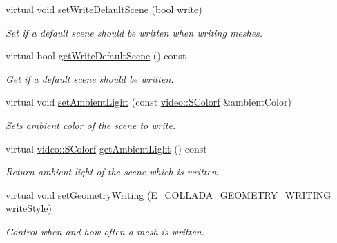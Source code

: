 \begin{DoxyCompactItemize}
virtual void \hyperlink{classirr_1_1scene_1_1IColladaMeshWriter_acf1952c459b4b2bde5b479b6d9717c35}{set\+Write\+Default\+Scene} (bool write)
\begin{DoxyCompactList}\small\item\em Set if a default scene should be written when writing meshes. \end{DoxyCompactList}\item 
\mbox{\label{classirr_1_1scene_1_1IColladaMeshWriter_a311c259b48fade63a30c9b5f422571d4}} 
virtual bool \hyperlink{classirr_1_1scene_1_1IColladaMeshWriter_a311c259b48fade63a30c9b5f422571d4}{get\+Write\+Default\+Scene} () const
\begin{DoxyCompactList}\small\item\em Get if a default scene should be written. \end{DoxyCompactList}\item 
\mbox{\label{classirr_1_1scene_1_1IColladaMeshWriter_a410fb9e46db6250ff8bbf4ddb18ef1f2}} 
virtual void \hyperlink{classirr_1_1scene_1_1IColladaMeshWriter_a410fb9e46db6250ff8bbf4ddb18ef1f2}{set\+Ambient\+Light} (const \hyperlink{classirr_1_1video_1_1SColorf}{video\+::\+S\+Colorf} \&ambient\+Color)
\begin{DoxyCompactList}\small\item\em Sets ambient color of the scene to write. \end{DoxyCompactList}\item 
\mbox{\label{classirr_1_1scene_1_1IColladaMeshWriter_af263653d1159795a9aeead92c4e94b44}} 
virtual \hyperlink{classirr_1_1video_1_1SColorf}{video\+::\+S\+Colorf} \hyperlink{classirr_1_1scene_1_1IColladaMeshWriter_af263653d1159795a9aeead92c4e94b44}{get\+Ambient\+Light} () const
\begin{DoxyCompactList}\small\item\em Return ambient light of the scene which is written. \end{DoxyCompactList}\item 
virtual void \hyperlink{classirr_1_1scene_1_1IColladaMeshWriter_a25d2e1ff0bf04375c822800b0b3a4b01}{set\+Geometry\+Writing} (\hyperlink{namespaceirr_1_1scene_a179008e7c02889459edf81394dbd6959}{E\+\_\+\+C\+O\+L\+L\+A\+D\+A\+\_\+\+G\+E\+O\+M\+E\+T\+R\+Y\+\_\+\+W\+R\+I\+T\+I\+NG} write\+Style)
\begin{DoxyCompactList}\small\item\em Control when and how often a mesh is written. \end{DoxyCompactList}\item 

\end{DoxyCompactItemize}
